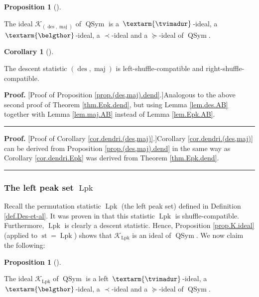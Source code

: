 \documentclass[numbers=enddot,12pt,final,onecolumn,notitlepage]{scrartcl}%
\theoremstyle{definition}
\newtheorem{prop}[theo]{Proposition}
\newenvironment{proposition}[1][]
{\begin{prop}[#1]\begin{leftbar}}
{\end{leftbar}\end{prop}}
\newtheorem{coro}[theo]{Corollary}
\newenvironment{corollary}[1][]
{\begin{coro}[#1]\begin{leftbar}}
{\end{leftbar}\end{coro}}
\newenvironment{proof}[1][Proof]{\noindent\textbf{#1.} }{\ \rule{0.5em}{0.5em}}
\newcommand{\tvi}{\left. \textarm{\tvimadur} \right.}
\newcommand{\bel}{\left. \textarm{\belgthor} \right.}
\begin{document}
\begin{proposition}
\label{prop.(des,maj).dend}The ideal $\mathcal{K}_{\left(  \operatorname*{des}%
,\operatorname*{maj}\right)  }$ of $\operatorname*{QSym}$ is a $\tvi$-ideal, a
$\bel$-ideal, a $\left.  \prec\right.  $-ideal and a $\left.  \succeq\right.
$-ideal of $\operatorname*{QSym}$.
\end{proposition}

\begin{corollary}
\label{cor.dendri.(des,maj)}The descent statistic $\left(  \operatorname*{des}%
,\operatorname*{maj}\right)  $ is left-shuffle-compatible and right-shuffle-compatible.
\end{corollary}

\begin{proof}
[Proof of Proposition \ref{prop.(des,maj).dend}.]Analogous to the above second
proof of Theorem \ref{thm.Epk.dend}, but using Lemma \ref{lem.des.AB} together
with Lemma \ref{lem.maj.AB} instead of Lemma \ref{lem.Epk.AB}.
\end{proof}

\begin{proof}
[Proof of Corollary \ref{cor.dendri.(des,maj)}.]Corollary
\ref{cor.dendri.(des,maj)} can be derived from Proposition
\ref{prop.(des,maj).dend} in the same way as Corollary \ref{cor.dendri.Epk}
was derived from Theorem \ref{thm.Epk.dend}.
\end{proof}

\subsubsection{The left peak set $\operatorname*{Lpk}$}

Recall the permutation statistic $\operatorname*{Lpk}$ (the left peak set)
defined in Definition \ref{def.Des-et-al}. It was proven in \cite[Theorem 4.9
\textbf{(a)}]{part1} that this statistic $\operatorname*{Lpk}$ is
shuffle-compatible. Furthermore, $\operatorname*{Lpk}$ is clearly a descent
statistic. Hence, Proposition \ref{prop.K.ideal} (applied to
$\operatorname*{st}=\operatorname*{Lpk}$) shows that $\mathcal{K}%
_{\operatorname*{Lpk}}$ is an ideal of $\operatorname*{QSym}$. We now claim
the following:

\begin{proposition}
\label{prop.Lpk.dend}The ideal $\mathcal{K}_{\operatorname*{Lpk}}$ of
$\operatorname*{QSym}$ is a left $\tvi$-ideal, a $\bel$-ideal, a $\left.
\prec\right.  $-ideal and a $\left.  \succeq\right.  $-ideal of
$\operatorname*{QSym}$.
\end{proposition}
\end{document}
